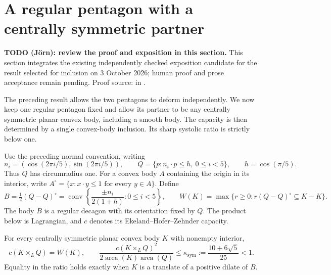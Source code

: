 \section{A regular pentagon with a centrally symmetric partner}
\label{sec:pentagon-symmetric-partner}

\begin{unverified}
\noindent\textbf{TODO (J\"orn): review the proof and exposition in this section.}
This section integrates the existing independently checked exposition candidate
for the result selected for inclusion on 3 October 2026; human proof and prose
acceptance remain pending.
Proof source:
 in
.
\end{unverified}

The preceding result allows the two pentagons to deform independently.
We now keep one regular pentagon fixed and allow its partner to be any
centrally symmetric planar convex body, including a smooth body. The
capacity is then determined by a single convex-body inclusion. Its sharp
systolic ratio is strictly below one.

Use the preceding normal convention, writing
\[
 n_i=(\cos(2\pi i/5),\sin(2\pi i/5)),\qquad
 Q=\{p:n_i\cdot p\le h,\ 0\le i<5\},\qquad h=\cos(\pi/5).
\]
Thus $Q$ has circumradius one. For a convex body $A$ containing the origin
in its interior, write
$A^\circ=\{x:x\cdot y\le1\text{ for every }y\in A\}$.
Define
\[
 B=\tfrac12(Q-Q)^\circ
   =\operatorname{conv}\left\{\frac{\pm n_i}{2(1+h)}:0\le i<5\right\},
 \qquad
 W(K)=\max\{r\ge0:r(Q-Q)^\circ\subseteq K-K\}.
\]
The body $B$ is a regular decagon with its orientation fixed by $Q$.
The product below is Lagrangian, and $c$ denotes its
Ekeland--Hofer--Zehnder capacity.

\begin{theorem}\label{thm:pentagon-symmetric-partner}
For every centrally symmetric planar convex body $K$ with nonempty interior,
\[
 c(K\times_L Q)=W(K),\qquad
 \frac{c(K\times_L Q)^2}{2\operatorname{area}(K)\operatorname{area}(Q)}
 \le \kappa_{\mathrm{sym}}:=\frac{10+6\sqrt5}{25}<1.
\]
Equality in the ratio holds exactly when $K$ is a translate of a positive
dilate of $B$.
\end{theorem}

